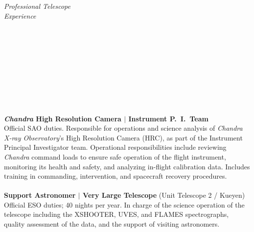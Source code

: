 \documentclass[11pt]{article}
\begin{document}
\hspace{2.5mm} \parbox{1.5in}{{\it Professional Telescope \\ Experience \\\\\\\\\\\\\\\\\\\\}} \parbox{5.15in}{
\textbf{\textit{Chandra} High Resolution Camera $|$ Instrument P.~I.~Team}\\
Official SAO duties. Responsible for operations and science analysis
of \textit{Chandra X-ray Observatory}'s High Resolution Camera (HRC), as part of the Instrument Principal Investigator team. Operational responsibilities include reviewing \textit{Chandra} command loads to ensure safe operation of the flight instrument, monitoring its health and safety, and analyzing in-flight calibration data. Includes training in commanding, intervention, and spacecraft recovery procedures.
\\\\
\textbf{Support Astronomer $|$ Very Large Telescope} (Unit Telescope 2 / Kueyen)\\
Official ESO duties; 40 nights per year. In charge of the science operation of the telescope including the XSHOOTER, UVES, and FLAMES spectrographs, quality assessment of the data, and the support of visiting astronomers. 
}\\



\vspace{4mm}
\end{document}
